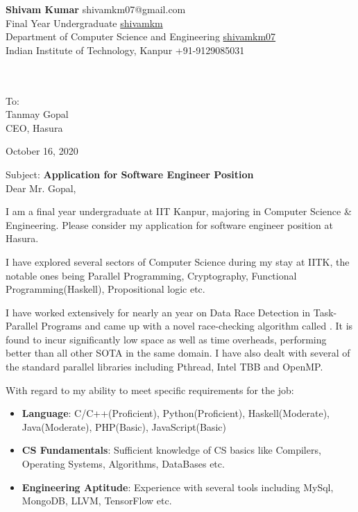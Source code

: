 \documentclass[12pt, a4paper]{awesome-cv}
\begin{document}
\makecvfooter
  {}
  {}
  {\thepage}
\begin{minipage}[t]{\textwidth}
	{\Huge\textbf{\sc Shivam Kumar}}
	\hfill
	shivamkm07@gmail.com \faEnvelope\\	
	Final Year Undergraduate
	\hfill
	\href{https://github.com/shivamkm/}{shivamkm \faGithub}
	\\	
	Department of Computer Science and Engineering
	\hfill
	\href{https://www.linkedin.com/in/shivamkm07/}{shivamkm07 \faLinkedin}\\
	Indian Institute of Technology, Kanpur
	\hfill +91-9129085031 \faMobile
\end{minipage}
\\\\


{\color{blue}To:\\}
Tanmay Gopal\\
CEO, Hasura

\hfill{\color{gray}October 16, 2020}

Subject: \textbf{Application for Software Engineer Position}\\

Dear Mr. Gopal,
	
	I am a final year undergraduate at IIT Kanpur, majoring in Computer Science \& Engineering. Please consider my application for software engineer position at Hasura.
	
	I have explored several sectors of Computer Science during my stay at IITK, the notable ones being Parallel Programming, Cryptography, Functional Programming(Haskell), Propositional logic etc. 
		
	I have worked extensively for nearly an year on Data Race Detection in Task-Parallel Programs and came up with a novel race-checking algorithm called {}. It is found to incur significantly low space as well as time overheads, performing better than all other SOTA in the same domain. I have also dealt with several of the standard parallel libraries including Pthread, Intel TBB and OpenMP.
	
	With regard to my ability to meet specific requirements for the job:
	\begin{itemize}
		\item \textbf{Language}: C/C++(Proficient), Python(Proficient), Haskell(Moderate), Java(Moderate), PHP(Basic), JavaScript(Basic)
		
		\item \textbf{CS Fundamentals}: Sufficient knowledge of CS basics like Compilers, Operating Systems, Algorithms, DataBases etc. 
		
		\item \textbf{Engineering Aptitude}: Experience with several tools including MySql, MongoDB, LLVM, TensorFlow etc.
	
	\end{itemize}
	
\end{document}
